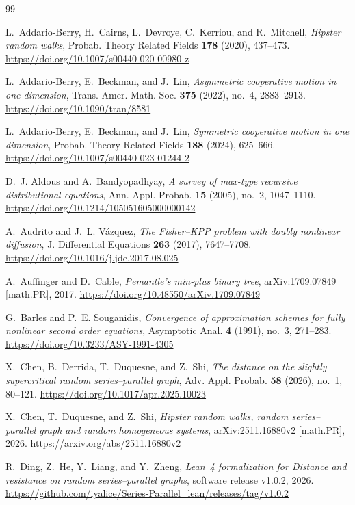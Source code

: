 \documentclass[12pt]{amsart}
\numberwithin{equation}{section}
\theoremstyle{plain}
\theoremstyle{definition}
\begin{document}
\begin{thebibliography}{99}

L.~Addario-Berry, H.~Cairns, L.~Devroye, C.~Kerriou, and R.~Mitchell,
\emph{Hipster random walks},
Probab. Theory Related Fields \textbf{178} (2020), 437--473.
\url{https://doi.org/10.1007/s00440-020-00980-z}

L.~Addario-Berry, E.~Beckman, and J.~Lin,
\emph{Asymmetric cooperative motion in one dimension},
Trans. Amer. Math. Soc. \textbf{375} (2022), no.~4, 2883--2913.
\url{https://doi.org/10.1090/tran/8581}

L.~Addario-Berry, E.~Beckman, and J.~Lin,
\emph{Symmetric cooperative motion in one dimension},
Probab. Theory Related Fields \textbf{188} (2024), 625--666.
\url{https://doi.org/10.1007/s00440-023-01244-2}

D.~J. Aldous and A.~Bandyopadhyay,
\emph{A survey of max-type recursive distributional equations},
Ann. Appl. Probab. \textbf{15} (2005), no.~2, 1047--1110.
\url{https://doi.org/10.1214/105051605000000142}

A.~Audrito and J.~L. V\'azquez,
\emph{The Fisher--KPP problem with doubly nonlinear diffusion},
J. Differential Equations \textbf{263} (2017), 7647--7708.
\url{https://doi.org/10.1016/j.jde.2017.08.025}

A.~Auffinger and D.~Cable,
\emph{Pemantle's min-plus binary tree},
arXiv:1709.07849 [math.PR], 2017.
\url{https://doi.org/10.48550/arXiv.1709.07849}

G.~Barles and P.~E. Souganidis,
\emph{Convergence of approximation schemes for fully nonlinear second order
equations},
Asymptotic Anal. \textbf{4} (1991), no.~3, 271--283.
\url{https://doi.org/10.3233/ASY-1991-4305}

X.~Chen, B.~Derrida, T.~Duquesne, and Z.~Shi,
\emph{The distance on the slightly supercritical random series--parallel graph},
Adv. Appl. Probab. \textbf{58} (2026), no.~1, 80--121.
\url{https://doi.org/10.1017/apr.2025.10023}

X.~Chen, T.~Duquesne, and Z.~Shi,
\emph{Hipster random walks, random series--parallel graph and random homogeneous
systems},
arXiv:2511.16880v2 [math.PR], 2026.
\url{https://arxiv.org/abs/2511.16880v2}

R.~Ding, Z.~He, Y.~Liang, and Y.~Zheng,
\emph{Lean~4 formalization for Distance and resistance on random series--parallel graphs},
software release v1.0.2, 2026.
\url{https://github.com/iyalice/Series-Parallel_lean/releases/tag/v1.0.2}


\end{thebibliography}
\end{document}
